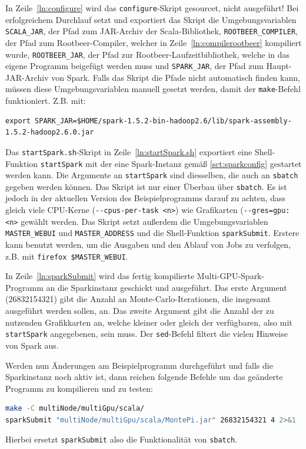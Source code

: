 In Zeile~\ref{ln:configure} wird das \lstinline!configure!-Skript gesourcet, nicht ausgeführt!
Bei erfolgreichem Durchlauf setzt und exportiert das Skript die Umgebungsvariablen \lstinline!SCALA_JAR!, der Pfad zum JAR-Archiv der Scala-Bibliothek, \lstinline!ROOTBEER_COMPILER!, der Pfad zum Rootbeer-Compiler, welcher in Zeile~\ref{ln:compilerootbeer} kompiliert wurde, \lstinline!ROOTBEER_JAR!, der Pfad zur Rootbeer-Laufzeitbibliothek, welche in das eigene Programm beigefügt werden muss und \lstinline!SPARK_JAR!, der Pfad zum Haupt-JAR-Archiv von Spark.
Falls das Skript die Pfade nicht automatisch finden kann, müssen diese Umgebungsvariablen manuell gesetzt werden, damit der \lstinline!make!-Befehl funktioniert. Z.B. mit:
\begin{lstlisting}
export SPARK_JAR=$HOME/spark-1.5.2-bin-hadoop2.6/lib/spark-assembly-1.5.2-hadoop2.6.0.jar
\end{lstlisting}\vspace{-1.5\baselineskip}

Das \lstinline!startSpark.sh!-Skript in Zeile~\ref{ln:startSpark.sh} exportiert eine Shell-Funktion \lstinline!startSpark! mit der eine Spark-Instanz gemäß \autoref{sct:sparkconfig} gestartet werden kann.
Die Argumente an \lstinline!startSpark! sind diesselben, die auch an \lstinline!sbatch! gegeben werden können.
Das Skript ist nur einer Überbau über \lstinline!sbatch!. Es ist jedoch in der aktuellen Version des Beispielprogramms darauf zu achten, dass gleich viele CPU-Kerne (\lstinline!--cpus-per-task <n>!) wie Grafikarten (\lstinline!--gres=gpu:<n>! gewählt werden.
Das Skript setzt außerdem die Umgebungsvariablen \lstinline!MASTER_WEBUI! und \lstinline!MASTER_ADDRESS! und die Shell-Funktion \lstinline!sparkSubmit!.
Erstere kann benutzt werden, um die Ausgaben und den Ablauf von Jobs zu verfolgen, z.B. mit \lstinline!firefox $MASTER_WEBUI!.

In Zeile~\ref{ln:sparkSubmit} wird das fertig kompilierte Multi-GPU-Spark-Programm an die Sparkinstanz geschickt und ausgeführt.
Das erste Argument (26832154321) gibt die Anzahl an Monte-Carlo-Iterationen, die insgesamt ausgeführt werden sollen, an.
Das zweite Argument gibt die Anzahl der zu nutzenden Grafikkarten an, welche kleiner oder gleich der verfügbaren, also mit \lstinline!startSpark! angegebenen, sein muss.
Der \lstinline!sed!-Befehl filtert die vielen Hinweise von Spark aus.

Werden nun Änderungen am Beispielprogramm durchgeführt und falls die Sparkinstanz noch aktiv ist, dann reichen folgende Befehle um das geänderte Programm zu kompilieren und zu testen:
\begin{lstlisting}[language=Bash]
make -C multiNode/multiGpu/scala/
sparkSubmit "multiNode/multiGpu/scala/MontePi.jar" 26832154321 4 2>&1 | sed '/ INFO /d'
\end{lstlisting}\vspace{-1.5\baselineskip}

Hierbei ersetzt \lstinline!sparkSubmit! also die Funktionalität von \lstinline!sbatch!.
